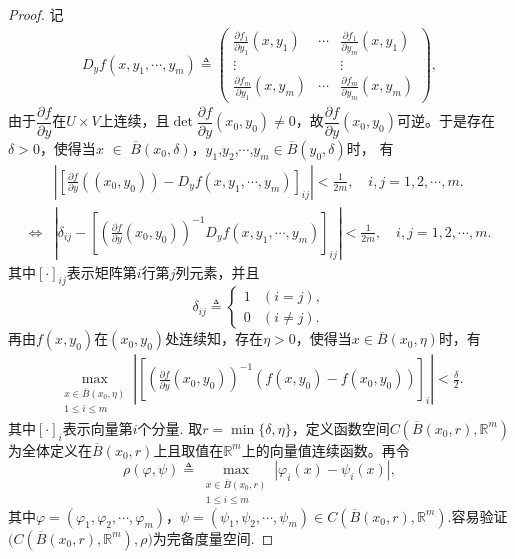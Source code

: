 \documentclass[../../main.tex]{subfiles}%
\begin{document}
\begin{proof}

记
\begin{align*}
D_y f(x, y_1, \cdots, y_m) \triangleq \begin{pmatrix}
\frac{\partial f_1}{\partial y_1}(x,y_1)&\cdots&\frac{\partial f_1}{\partial y_m}(x,y_1)\\
\vdots&&\vdots\\
\frac{\partial f_m}{\partial y_1}(x,y_m)&\cdots&\frac{\partial f_m}{\partial y_m}(x,y_m)
\end{pmatrix},
\end{align*}
由于$\dfrac{\partial f}{\partial y}$在$U\times V$上连续，且$\det\dfrac{\partial f}{\partial y}(x_0,y_0)\neq 0$，故$\dfrac{\partial f}{\partial y}(x_0,y_0)$可逆。于是存在$\delta>0$，使得当$x$ $\in$ $\overline{B}(x_0,\delta)$，$y_1$,$y_2$,$\cdots$,$y_m\in\overline{B}(y_0,\delta)$时，
有
\begin{align}
&\left| \left[ \frac{\partial f}{\partial y}\left( (x_0,y_0) \right)-D_yf\left( x,y_1,\cdots ,y_m \right)\right] _{ij} \right|<\frac{1}{2m},\quad i,j=1,2,\cdots ,m.
\nonumber \\
\Longleftrightarrow &\left| \delta _{ij}-\left[ \left( \frac{\partial f}{\partial y}(x_0,y_0) \right) ^{-1}D_yf(x,y_1,\cdots ,y_m) \right] _{ij} \right|<\frac{1}{2m},\quad i,j=1,2,\cdots ,m.
\label{eq:::111616156}
\end{align}
其中$[\cdot]_{ij}$表示矩阵第$i$行第$j$列元素，并且
\[
\delta_{ij} \triangleq \begin{cases} 
1 & (i = j), \\
0 & (i \neq j).
\end{cases}
\]
再由$f(x,y_0)$在$(x_0,y_0)$处连续知，存在$\eta>0$，使得当$x\in\overline{B}(x_0,\eta)$时，有
\begin{align}\label{eq::0j90qij390UFORJFJAWJ}
\max_{\substack{x \in \overline{B}(x_0, \eta) \\ 1 \leqslant i \leqslant m}} \left| \left[ \left( \frac{\partial f}{\partial y}(x_0, y_0) \right)^{-1} (f(x, y_0) - f(x_0, y_0)) \right]_i \right| < \frac{\delta}{2}.
\end{align}
其中$[\cdot]_{i}$表示向量第$i$个分量.
取$r=\min\{\delta,\eta\}$，定义函数空间$C\left(\overline{B}(x_0, r), \mathbb{R}^m\right)$为全体定义在$\overline{B}(x_0, r)$上且取值在$\mathbb{R}^m$上的向量值连续函数。再令
\[
\rho(\varphi, \psi) \triangleq \max_{\substack{x \in \overline{B}(x_0, r) \\ 1 \leqslant i \leqslant m}} |\varphi_i(x) - \psi_i(x)|,
\]
其中$\varphi = (\varphi_1, \varphi_2, \cdots, \varphi_m)$，$\psi = (\psi_1, \psi_2, \cdots, \psi_m)\in C\left(\overline{B}(x_0, r), \mathbb{R}^m\right)$.容易验证$\big(C(\overline{B}(x_0,r),\mathbb{R}^m),\rho\big)$为完备度量空间.


\end{proof}
\end{document}
